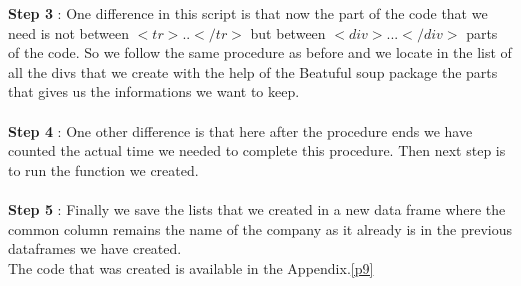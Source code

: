 \documentclass{article}
\begin{document}
\textbf{Step 3} : One difference in this script is that now the part of the code that we need is not between $<tr>..</tr>$ but between $<div>...</div>$ parts of the code. So we follow the same procedure as before and we locate in the list of all the divs that we create with the help of the Beatuful soup package the parts that gives us the informations we want to keep.\\\\
\textbf{Step 4} : One other difference is that here after the procedure ends we have counted the actual time we needed to complete this procedure. Then next step is to run the function we created.\\\\
\textbf{Step 5} : Finally we save the lists that we created in a new data frame where the common column remains the name of the company as it already is in the previous dataframes we have created.\\
The code that was created is available in the Appendix.\ref{p9}
\end{document}
